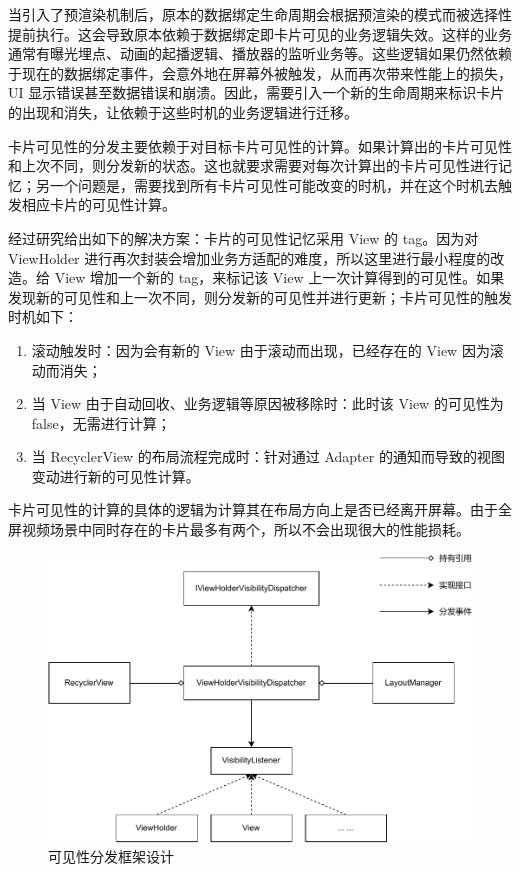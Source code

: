 当引入了预渲染机制后，原本的数据绑定生命周期会根据预渲染的模式而被选择性提前执行。这会导致原本依赖于数据绑定即卡片可见的业务逻辑失效。这样的业务通常有曝光埋点、动画的起播逻辑、播放器的监听业务等。这些逻辑如果仍然依赖于现在的数据绑定事件，会意外地在屏幕外被触发，从而再次带来性能上的损失，UI 显示错误甚至数据错误和崩溃。因此，需要引入一个新的生命周期来标识卡片的出现和消失，让依赖于这些时机的业务逻辑进行迁移。

卡片可见性的分发主要依赖于对目标卡片可见性的计算。如果计算出的卡片可见性和上次不同，则分发新的状态。这也就要求需要对每次计算出的卡片可见性进行记忆；另一个问题是，需要找到所有卡片可见性可能改变的时机，并在这个时机去触发相应卡片的可见性计算。

经过研究给出如下的解决方案：卡片的可见性记忆采用 View 的 tag。因为对 ViewHolder 进行再次封装会增加业务方适配的难度，所以这里进行最小程度的改造。给 View 增加一个新的 tag，来标记该 View 上一次计算得到的可见性。如果发现新的可见性和上一次不同，则分发新的可见性并进行更新；卡片可见性的触发时机如下：

\begin{enumerate}
    \item 滚动触发时：因为会有新的 View 由于滚动而出现，已经存在的 View 因为滚动而消失；
    \item 当 View 由于自动回收、业务逻辑等原因被移除时：此时该 View 的可见性为false，无需进行计算；
    \item 当 RecyclerView 的布局流程完成时：针对通过 Adapter 的通知而导致的视图变动进行新的可见性计算。
\end{enumerate}

卡片可见性的计算的具体的逻辑为计算其在布局方向上是否已经离开屏幕。由于全屏视频场景中同时存在的卡片最多有两个，所以不会出现很大的性能损耗。



\begin{figure}
    \centering
    \begin{adjustbox}{max width=\textwidth}
        \includegraphics{assets/visibility-dispatch-framework.pdf}
    \end{adjustbox}
    \caption{可见性分发框架设计}
\end{figure}

